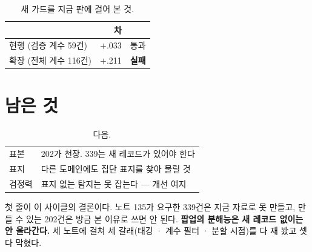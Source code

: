 \documentclass[10pt]{article}
\begin{document}
\begin{table}[t]
\centering\tsize
\caption{새 가드를 지금 판에 걸어 본 것.}
\begin{tabular}{lrl}
\toprule
& 차 & \\
\midrule
현행 (검증 계수 59건) & $+$.033 & 통과 \\
확장 (전체 계수 116건) & $+$.211 & \textbf{실패} \\
\bottomrule
\end{tabular}
\end{table}

\section{남은 것}

\begin{table}[t]
\centering\tsize
\caption{다음.}
\begin{tabular}{ll}
\toprule
표본 & 202가 천장. 339는 새 레코드가 있어야 한다 \\
표지 & 다른 도메인에도 집단 표지를 찾아 물릴 것 \\
검정력 & 표지 없는 탐지는 못 잡는다 --- 개선 여지 \\
\bottomrule
\end{tabular}
\end{table}

첫 줄이 이 사이클의 결론이다. 노트 135가 요구한 339건은 지금 자료로 못
만들고, 만들 수 있는 202건은 방금 본 이유로 쓰면 안 된다. \textbf{팝업의
분해능은 새 레코드 없이는 안 올라간다.} 세 노트에 걸쳐 세 갈래(태깅 ·
계수 필터 · 분할 시점)를 다 재 봤고 셋 다 막혔다.
\end{document}
